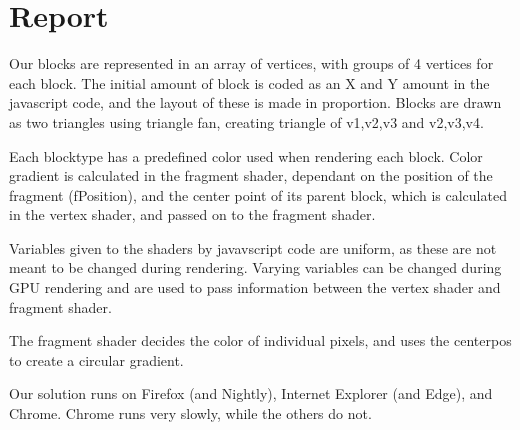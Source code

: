 \section{Report}



Our blocks are represented in an array of vertices, with groups of 4 vertices for each block.
The initial amount of block is coded as an X and Y amount in the javascript code,
and the layout of these is made in proportion.
Blocks are drawn as two triangles using triangle fan, creating triangle of v1,v2,v3 and v2,v3,v4.


Each blocktype has a predefined color used when rendering each block.
Color gradient is calculated in the fragment shader, 
dependant on the position of the fragment (fPosition),
and the center point of its parent block, which is calculated in the vertex shader, 
and passed on to the fragment shader.


Variables given to the shaders by javavscript code are uniform, 
as these are not meant to be changed during rendering.
Varying variables can be changed during GPU rendering and are 
used to pass information between the vertex shader and fragment shader.



The fragment shader decides the color of individual pixels, 
and uses the centerpos to create a circular gradient.


Our solution runs on Firefox (and Nightly), Internet Explorer (and Edge), and Chrome.
Chrome runs very slowly, while the others do not.